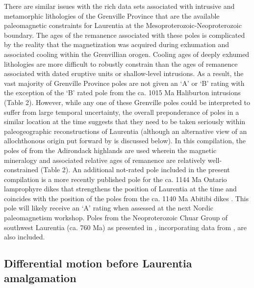 \documentclass[twocolumn, switch]{article} %
\begin{document}
There are similar issues with the rich data sets associated with intrusive and metamorphic lithologies of the Grenville Province that are the available paleomagnetic constraints for Laurentia at the Mesoproterozoic-Neoproterozoic boundary. The ages of the remanence associated with these poles is complicated by the reality that the magnetization was acquired during exhumation and associated cooling within the Grenvillian orogen. Cooling ages of deeply exhumed lithologies are more difficult to robustly constrain than the ages of remanence associated with dated eruptive units or shallow-level intrusions. As a result, the vast majority of Grenville Province poles are not given an `A' or `B' rating with the exception of the `B' rated pole from the ca. 1015 Ma Haliburton intrusions (Table 2). However, while any one of these Grenville poles could be interpreted to suffer from large temporal uncertainty, the overall preponderance of poles in a similar location at the time suggests that they need to be taken seriously within paleogeographic reconstructions of Laurentia (although an alternative view of an allochthonous origin put forward by \citealp{Halls2015a} is discussed below). In this compilation, the poles of \cite{Brown2012a} from the Adirondack highlands are used wherein the magnetic mineralogy and associated relative ages of remanence are relatively well-constrained (Table 2). An additional not-rated pole included in the present compilation is a more recently published pole for the ca. 1144 Ma Ontario lamprophyre dikes \citep{Piispa2018a} that strengthens the position of Laurentia at the time and coincides with the position of the poles from the ca. 1140 Ma Abitibi dikes \citep{Ernst1993a}. This pole will likely receive an `A' rating when assessed at the next Nordic paleomagnetism workshop. Poles from the Neoproterozoic Chuar Group of southwest Laurentia (ca. 760 Ma)  as presented in \cite{Eyster2019a}, incorporating data from \cite{Weil2004a}, are also included. 

\subsection{Differential motion before Laurentia amalgamation}
\end{document}
